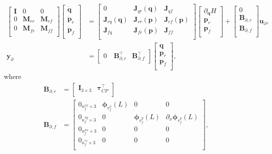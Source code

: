 \documentclass{svjour3}                     %
\begin{document}
\begin{equation}
\label{eq:EB_sys}
\begin{aligned}
\begin{bmatrix}
\mathbf{I} & 0 & 0 \\
0 & \mathbf{M}_{rr} & \mathbf{M}_{rf}\\ 
0 & \mathbf{M}_{fr} & \mathbf{M}_{ff}\\
\end{bmatrix} 
\begin{bmatrix}
\dot{\mathbf{q}} \\ 
\dot{\mathbf{p}}_{r} \\ 
\dot{\mathbf{p}}_{f} \\ 
\end{bmatrix} &= 
\begin{bmatrix}
0 & \mathbf{J}_{qr}(\mathbf{q}) & \mathbf{J}_{qf} \\
\mathbf{J}_{rq}(\mathbf{q}) & \mathbf{J}_{rr}(\mathbf{p}) & \mathbf{J}_{rf}(\mathbf{p})\\ 
\mathbf{J}_{fq} & \mathbf{J}_{fr}(\mathbf{p}) & \mathbf{J}_{ff}\\
\end{bmatrix}  
\begin{bmatrix}
\partial_{\mathbf{q}} H \\
{\mathbf{p}}_{r} \\ 
{\mathbf{p}}_{f} \\ 
\end{bmatrix} + 
\begin{bmatrix}
0 \\
\mathbf{B}_{\partial, r} \\ 
\mathbf{B}_{\partial, f} \\ 
\end{bmatrix}
 \mathbf{u}_\partial, \\
\mathbf{y}_\partial &= \begin{bmatrix}
0 \ & \mathbf{B}_{\partial, r}^\top & \mathbf{B}_{\partial, f}^\top  
\end{bmatrix} \begin{bmatrix}
\mathbf{q} \\
{\mathbf{p}}_{r} \\ 
{\mathbf{p}}_{f} \\ 
\end{bmatrix},
\end{aligned}
\end{equation}
where 
\begin{align*}
\mathbf{B}_{\partial, r} &= \begin{bmatrix}
\mathbf{I}_{3\times 3} & \bm\tau_{CP}^\top \\
\end{bmatrix} \\
\mathbf{B}_{\partial, f} &= \begin{bmatrix}
0_{n_f^{vx} \times 3} & \bm{\phi}_{v_f^x}(L) & 0 & 0 \\
0_{n_f^{vy} \times 3} & 0 & \bm{\phi}_{v_f^y}(L) & \partial_x \bm{\phi}_{v_f^y}(L) \\
0_{n_f^{\sigma x} \times 3} & 0 & 0 & 0 \\
0_{n_f^^{\sigma y} \times 3} & 0 & 0 & 0 \\
\end{bmatrix},
\end{align*}
\end{document}
